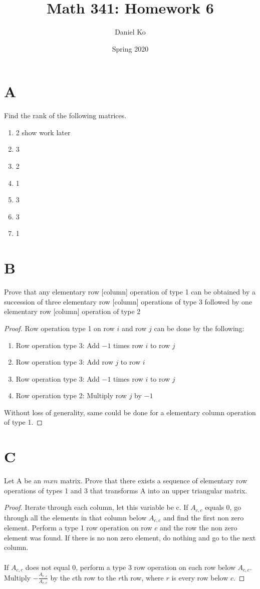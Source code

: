 \documentclass[11pt]{scrartcl}
\title{Math 341: Homework 6}
\author{Daniel Ko}
\date{Spring 2020}
\begin{document}
\maketitle

\section{A}
Find the rank of the following matrices.

\begin{enumerate}[label=\alph*.]
	\item{
			2
			show work later
	}
	\item{
			3
		}
	\item{
			2
	}
	\item{
			1
		}
	\item{
			3
		}
	\item{
			3
	}
	\item{
			1
		}
\end{enumerate}

\section{B}
Prove that any elementary row [column] operation of type 1 can be obtained by a succession of three elementary
row [column] operations of type 3 followed by one elementary row [column] operation of type 2
\begin{proof}
Row operation type 1 on row $i$ and row $j$ can be done by the following:
\begin{enumerate}[label=\arabic*.]
	\item{
		Row operation type 3: Add $-1$ times row $i$ to row $j$ 
	}
	\item{
		Row operation type 3: Add row $j$ to row $i$
	}
	\item{
		Row operation type 3: Add $-1$ times row $i$ to row $j$
	}
	\item{
		Row operation type 2: Multiply row $j$ by $-1$
	}
\end{enumerate}
Without loss of generality, same could be done for a elementary column operation of type 1.
\end{proof}

\section{C}
Let A be an $mxn$ matrix. Prove that there exists a sequence of elementary row operations of types 1 and 3 that
transforms A into an upper triangular matrix.
\begin{proof}
	Iterate through each column, let this variable be c. If $A_{c,c}$ equals 0, go through all the elements in that column below
	$A_{c,c}$ and find the first non zero element. Perform a type 1 row operation on row $c$ and the row the non zero element
	was found. If there is no non zero element, do nothing and go to the next column. \\
	\-\\
	If $A_{c,c}$ does not equal 0, perform a type 3 row operation on each row below $A_{c,c}$. Multiply 
	$- \frac{A_{r,c}}{A_{c,c}}$ by the $c$th row to the $r$th row, where $r$ is every row below $c$.  
\end{proof}
\end{document}
